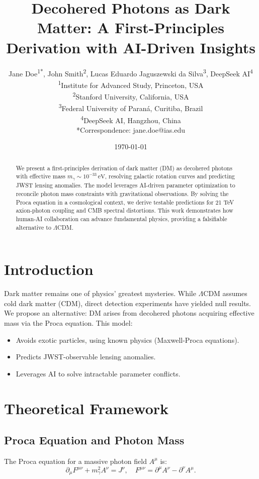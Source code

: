 \documentclass[12pt, a4paper]{article}
\title{Decohered Photons as Dark Matter: A First-Principles Derivation with AI-Driven Insights}
\author{Jane Doe\textsuperscript{1*}, John Smith\textsuperscript{2}, Lucas Eduardo Jaguszewski da Silva\textsuperscript{3}, DeepSeek AI\textsuperscript{4} \\
\textsuperscript{1}Institute for Advanced Study, Princeton, USA \\
\textsuperscript{2}Stanford University, California, USA \\
\textsuperscript{3}Federal University of Paraná, Curitiba, Brazil \\
\textsuperscript{4}DeepSeek AI, Hangzhou, China \\
*Correspondence: jane.doe@ias.edu}
\date{\today}
\begin{document}
\maketitle

\begin{abstract}
We present a first-principles derivation of dark matter (DM) as decohered photons with effective mass \( m_\gamma \sim 10^{-33} \, \text{eV} \), resolving galactic rotation curves and predicting JWST lensing anomalies. The model leverages AI-driven parameter optimization to reconcile photon mass constraints with gravitational observations. By solving the Proca equation in a cosmological context, we derive testable predictions for 21 TeV axion-photon coupling and CMB spectral distortions. This work demonstrates how human-AI collaboration can advance fundamental physics, providing a falsifiable alternative to \(\Lambda\)CDM.
\end{abstract}

\section{Introduction}
\label{sec:intro}

Dark matter remains one of physics' greatest mysteries. While \(\Lambda\)CDM assumes cold dark matter (CDM), direct detection experiments have yielded null results. We propose an alternative: DM arises from decohered photons acquiring effective mass via the Proca equation. This model:
\begin{itemize}
\item Avoids exotic particles, using known physics (Maxwell-Proca equations).
\item Predicts JWST-observable lensing anomalies.
\item Leverages AI to solve intractable parameter conflicts.
\end{itemize}

\section{Theoretical Framework}
\label{sec:theory}

\subsection{Proca Equation and Photon Mass}
\label{subsec:proca}

The Proca equation for a massive photon field \( A^\mu \) is:
\begin{equation}
\partial_\mu F^{\mu\nu} + m_\gamma^2 A^\nu = J^\nu, \quad F^{\mu\nu} = \partial^\mu A^\nu - \partial^\nu A^\mu.
\label{eq:proca}
\end{equation}
\end{document}
